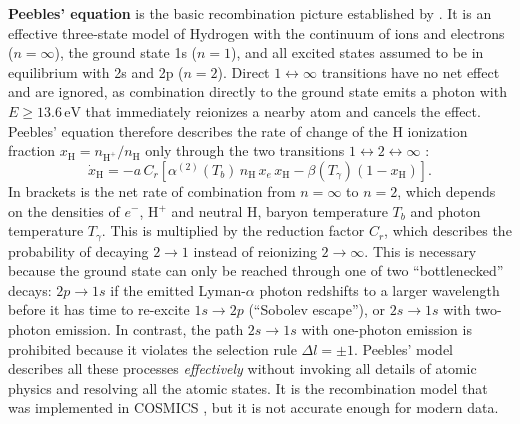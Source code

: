 \documentclass[USenglish, thumbmarks]{uiophdthesis} %
\newcommand\Hy{\ensuremath{\mathrm{H}}} %
\begin{document}
\textbf{Peebles' equation} is the basic recombination picture established by \cite{peeblesRecombinationPrimevalPlasma1968,zeldovichRecombinationHydrogenHot1968}.
It is an effective three-state model of Hydrogen with
the continuum of ions and electrons ($n=\infty$),
the ground state 1s ($n=1$),
and all excited states assumed to be in equilibrium with 2s and 2p ($n=2$).
Direct $1 \leftrightarrow \infty$ transitions have no net effect and are ignored,
as combination directly to the ground state emits a photon with $E \geq 13.6\,\mathrm{eV}$ that immediately reionizes a nearby atom and cancels the effect.
Peebles' equation therefore describes the rate of change of the \Hy{} ionization fraction $x_\Hy = n_{\Hy^+} / n_\Hy$
only through the two transitions $1 \leftrightarrow 2 \leftrightarrow \infty$ \cite{maCosmologicalPerturbationTheory1995a}:
\begin{equation}
\dot{x}_\Hy = -a \, C_r \left[ \alpha^{(2)}(T_b) \, n_\Hy \, x_e \, x_\Hy - \beta(T_\gamma) (1-x_\Hy) \right].
\label{eq:peebles}
\end{equation}
In brackets is the net rate of combination from $n=\infty$ to $n=2$,
which depends on the densities of $e^-$, $\Hy{}^+$ and neutral \Hy{},
baryon temperature $T_b$ and photon temperature $T_\gamma$.
This is multiplied by the reduction factor $C_r$,
which describes the probability of decaying $2 \to 1$ instead of reionizing $2 \to \infty$.
This is necessary because the ground state can only be reached through one of two \enquote{bottlenecked} decays:
$2p \to 1s$ if the emitted Lyman-$\alpha$ photon redshifts to a larger wavelength before it has time to re-excite $1s \to 2p$ (\enquote{Sobolev escape}),
or $2s \to 1s$ with two-photon emission.
In contrast, the path $2s \to 1s$ with one-photon emission is prohibited because it violates the selection rule $\Delta l = \pm 1$.
Peebles' model describes all these processes \emph{effectively}
without invoking all details of atomic physics and resolving all the atomic states.
It is the recombination model that was implemented in COSMICS \cite{maCosmologicalPerturbationTheory1995a},
but it is not accurate enough for modern data.
\end{document}
